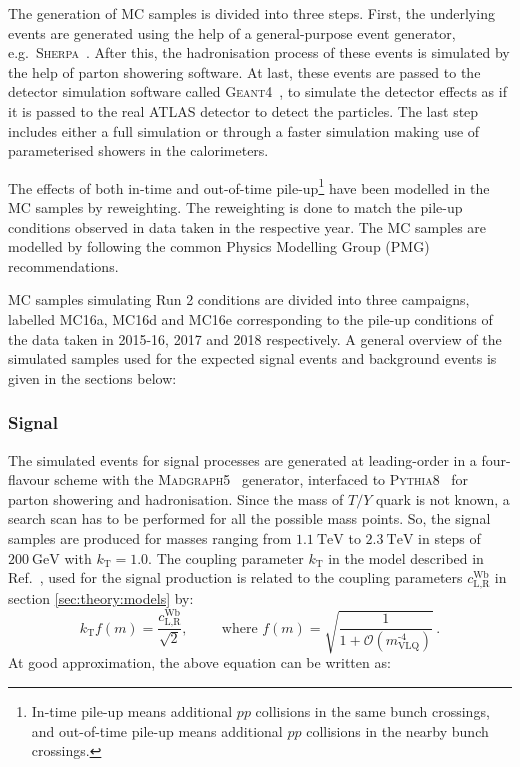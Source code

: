 The generation of MC samples is divided into three steps. First, the underlying events are generated using the help of a general-purpose event generator, e.g.\ \textsc{Sherpa}~\cite{sherpa}. After this, the hadronisation process of these events is simulated by the help of parton showering software. At last, these events are passed to the detector simulation software called \textsc{Geant4}~\cite{geant}, to simulate the detector effects as if it is passed to the real ATLAS detector to detect the particles. The last step includes either a full simulation or through a faster simulation making use of parameterised showers in the calorimeters. 

The effects of both in-time and out-of-time pile-up\footnote{In-time pile-up means additional $pp$ collisions in the same bunch crossings, and out-of-time pile-up means additional $pp$ collisions in the nearby bunch crossings.} have been modelled in the MC samples by reweighting. The reweighting is done to match the pile-up conditions observed in data taken in the respective year. The MC samples are modelled by following the common Physics Modelling Group (PMG) recommendations. 

MC samples simulating Run 2 conditions are divided into three campaigns, labelled MC16a, MC16d and MC16e corresponding to the pile-up conditions of the data taken in 2015-16, 2017 and 2018 respectively. A general overview of the simulated samples used for the expected signal events and background events is given in the sections below:

\subsubsection{Signal}%
\label{sec:analysisstrategy:mc:signal}
The simulated events for signal processes are generated at leading-order in a four-flavour scheme with the \textsc{Madgraph5}~\cite{madgraph} generator, interfaced to \textsc{Pythia8}~\cite{pythia} for parton showering and hadronisation. Since the mass of $T/Y$ quark is not known, a search scan has to be performed for all the possible mass points. So, the signal samples are produced for masses ranging from $\SI{1.1}{\tera\electronvolt}$ to $\SI{2.3}{\tera\electronvolt}$ in steps of $\SI{200}{\giga\electronvolt}$ with $k_\text{T} = 1.0$. The coupling parameter $k_{\text{T}}$ in the model described in Ref.\ \cite{wulzer}, used for the signal production is related to the coupling parameters $c_{\text{L,R}}^{\text{Wb}}$ in section \ref{sec:theory:models} by: 
\begin{equation*}
k_{\text{T}}f(m) = \frac{c_{\text{L,R}}^{\text{Wb}}}{\sqrt{2}}, \hspace{1cm} \text{where } f(m)= \sqrt{\frac{1}{1+\mathcal{O}(m_{\text{VLQ}}^{\text{-4}})}} \,.
\end{equation*}
At good approximation, the above equation can be written as:

